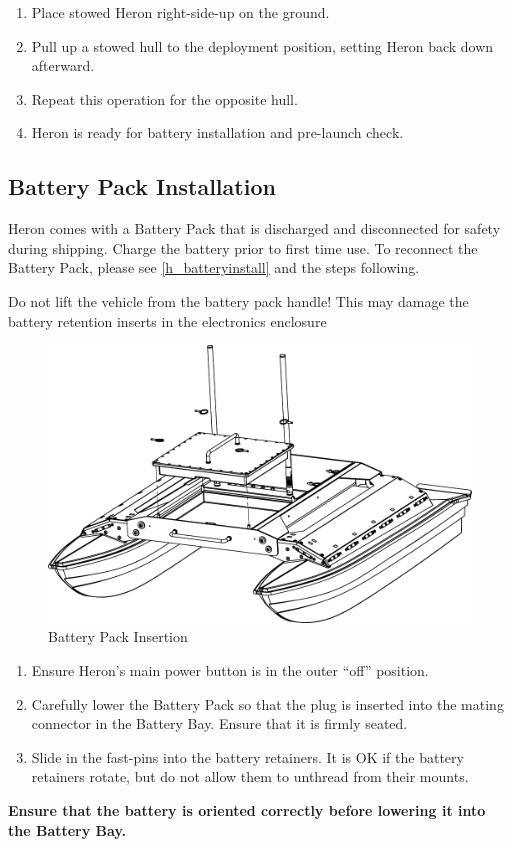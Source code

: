 \documentclass[]{clearpath-latex/clearpath-manual}
\begin{document}
\begin{enumerate}[nolistsep]
	\item Place stowed Heron right-side-up on the ground.
	\item Pull up a stowed hull to the deployment position, setting Heron back down afterward.
	\item Repeat this operation for the opposite hull.
	\item Heron is ready for battery installation and pre-launch check.
\end{enumerate}
\newpage

\subsection{Battery Pack Installation}
Heron comes with a Battery Pack that is discharged and disconnected for safety during shipping. Charge the battery prior to first time use.
To reconnect the Battery Pack, please see \autoref{h_batteryinstall} and the steps following.

\begin{warning}
Do not lift the vehicle from the battery pack handle! This may damage the battery retention inserts in the electronics enclosure
\end{warning}

\begin{figure}[h]
  \centering
  \includegraphics[width=0.75\linewidth]{h-battery.pdf}
  \caption{Battery Pack Insertion}
  \label{h_batteryinstall}
\end{figure}

\begin{enumerate}[nolistsep]
	\item Ensure Heron's main power button is in the outer “off” position.
	\item Carefully lower the Battery Pack so that the plug is inserted into the mating connector in the Battery Bay. Ensure that it is firmly seated.
	\item Slide in the fast-pins into the battery retainers. It is OK if the battery retainers rotate, but do not allow them to unthread from their mounts. 
\end{enumerate}
\textbf{Ensure that the battery is oriented correctly before lowering it into the Battery Bay.}
\end{document}
